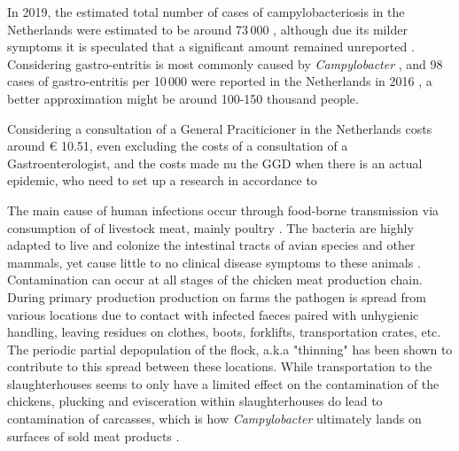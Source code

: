 In 2019, the estimated total number of cases of campylobacteriosis in the Netherlands were estimated to be around 73\,000 \parencite{lagerweij_disease_2020}, although due its milder symptoms it is speculated that a significant amount remained unreported \parencite{koutsoumanis_update_2020}. Considering gastro-entritis is most commonly caused by \textit{Campylobacter} \parencite{fouts_major_2005}, and 98 cases of gastro-entritis per 10\,000 were reported in the Netherlands in 2016 \parencite{van_pelt_jaarraport_2016}, a better approximation might be around 100-150 thousand people.

Considering a consultation of a General Praciticioner in the Netherlands costs around \euro{} 10.51, even excluding the costs of a consultation of a Gastroenterologist, and the costs made nu the GGD when there is an actual epidemic, who need to set up a research in accordance  to 


The main cause of human infections occur through food-borne transmission via consumption of of livestock meat, mainly poultry \parencite{wilson_tracing_2008}. The bacteria are highly adapted to live and colonize the intestinal tracts of avian species and other mammals, yet cause little to no clinical disease symptoms to these animals \parencite{saif_diseases_2008}. Contamination can occur at all stages of the chicken meat production chain. During primary production production on farms the pathogen is spread from various locations due to contact with infected faeces paired with unhygienic handling, leaving residues on clothes, boots, forklifts, transportation crates, etc. The periodic partial depopulation of the flock, a.k.a "thinning" has been shown to contribute to this spread between these locations. While transportation to the slaughterhouses seems to only have a limited effect on the contamination of the chickens, plucking and  evisceration within slaughterhouses do lead to contamination of carcasses, which is how \textit{Campylobacter} ultimately lands on surfaces of sold meat products \parencite{skarp_campylobacteriosis_2015}.

